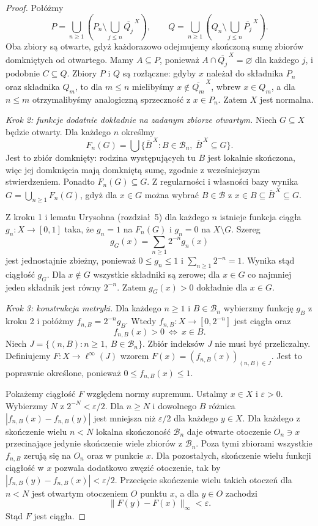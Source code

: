 \begin{proof}
Połóżmy
\[
P=\bigcup_{n\ge1}
 \left(P_n\setminus
       \bigcup_{j\le n}\overline{Q_j}^{\,X}\right),
\qquad
Q=\bigcup_{n\ge1}
 \left(Q_n\setminus
       \bigcup_{j\le n}\overline{P_j}^{\,X}\right).
\]
Oba zbiory są otwarte, gdyż każdorazowo
odejmujemy skończoną sumę zbiorów
domkniętych od otwartego.
Mamy $A\subseteq P$, ponieważ
$A\cap\overline{Q_j}^{\,X}=\varnothing$
dla każdego $j$, i podobnie
$C\subseteq Q$.
Zbiory $P$ i $Q$ są rozłączne:
gdyby $x$ należał do składnika
$P_n$ oraz składnika $Q_m$,
to dla $m\le n$ mielibyśmy
$x\notin\overline{Q_m}^{\,X}$,
wbrew $x\in Q_m$, a dla $n\le m$
otrzymalibyśmy analogiczną
sprzeczność z $x\in P_n$.
Zatem $X$ jest normalna.

\emph{Krok 2: funkcje dodatnie dokładnie
na zadanym zbiorze otwartym.}
Niech $G\subseteq X$ będzie otwarty.
Dla każdego $n$ określmy
\[
F_n(G)=
\bigcup\{\overline B^{\,X}:
 B\in\mathcal B_n,\
 \overline B^{\,X}\subseteq G\}.
\]
Jest to zbiór domknięty:
rodzina występujących tu $B$
jest lokalnie skończona, więc
jej domknięcia mają domkniętą sumę,
zgodnie z wcześniejszym stwierdzeniem.
Ponadto $F_n(G)\subseteq G$.
Z regularności i własności bazy
wynika
$G=\bigcup_{n\ge1}F_n(G)$,
gdyż dla $x\in G$ można wybrać
$B\in\mathcal B$ z
$x\in B\subseteq\overline B^{\,X}
\subseteq G$.

Z kroku 1 i lematu Urysohna
(rozdział~5) dla każdego $n$
istnieje funkcja ciągła
$g_n:X\to[0,1]$ taka, że
$g_n=1$ na $F_n(G)$ i
$g_n=0$ na $X\setminus G$.
Szereg
\[
g_G(x)=\sum_{n\ge1}2^{-n}g_n(x)
\]
jest jednostajnie zbieżny,
ponieważ $0\le g_n\le1$ i
$\sum_{n\ge1}2^{-n}=1$.
Wynika stąd ciągłość $g_G$.
Dla $x\notin G$ wszystkie składniki
są zerowe; dla $x\in G$
co najmniej jeden składnik jest
równy $2^{-n}$.
Zatem $g_G(x)>0$ dokładnie dla $x\in G$.

\emph{Krok 3: konstrukcja metryki.}
Dla każdego $n\ge1$ i
$B\in\mathcal B_n$ wybierzmy
funkcję $g_B$ z kroku 2 i połóżmy
$f_{n,B}=2^{-n}g_B$.
Wtedy $f_{n,B}:X\to[0,2^{-n}]$
jest ciągła oraz
\[
f_{n,B}(x)>0
\ \Longleftrightarrow\ x\in B.
\]
Niech
$J=\{(n,B):n\ge1,\ B\in\mathcal B_n\}$.
Zbiór indeksów $J$ nie musi być
przeliczalny. Definiujemy
$F:X\to\ell^\infty(J)$ wzorem
$F(x)=(f_{n,B}(x))_{(n,B)\in J}$.
Jest to poprawnie określone, ponieważ
$0\le f_{n,B}(x)\le1$.

Pokażemy ciągłość $F$ względem
normy supremum. Ustalmy $x\in X$
i $\varepsilon>0$.
Wybierzmy $N$ z
$2^{-N}<\varepsilon/2$.
Dla $n\ge N$ i dowolnego $B$
różnica
$|f_{n,B}(x)-f_{n,B}(y)|$
jest mniejsza niż $\varepsilon/2$
dla każdego $y\in X$.
Dla każdego z skończenie wielu $n<N$
lokalna skończoność $\mathcal B_n$
daje otwarte otoczenie $O_n\ni x$
przecinające jedynie skończenie
wiele zbiorów z $\mathcal B_n$.
Poza tymi zbiorami wszystkie
$f_{n,B}$ zerują się na $O_n$
oraz w punkcie $x$.
Dla pozostałych, skończenie
wielu funkcji ciągłość w $x$
pozwala dodatkowo zwęzić otoczenie,
tak by
$|f_{n,B}(y)-f_{n,B}(x)|
<\varepsilon/2$.
Przecięcie skończenie wielu
takich otoczeń dla $n<N$
jest otwartym otoczeniem $O$ punktu $x$,
a dla $y\in O$ zachodzi
\[
\|F(y)-F(x)\|_\infty<\varepsilon.
\]
Stąd $F$ jest ciągła.


\end{proof}

